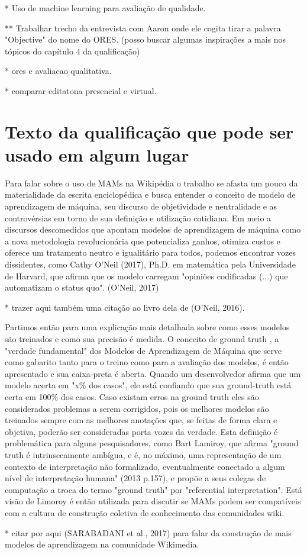 * Uso de machine learning para avaliação de qualidade.

** Trabalhar trecho da entrevista com Aaron onde ele cogita tirar a palavra "Objective" do nome do ORES. (posso buscar algumas inspirações a mais nos tópicos do capítulo 4 da qualificação)

* ores e avaliacao qualitativa.

* comparar editatona presencial e virtual.

\section{Texto da qualificação que pode ser usado em algum lugar}

Para falar sobre o uso de MAMs na Wikipédia o trabalho se afasta um pouco da materialidade da escrita enciclopédica e busca entender o conceito de modelo de aprendizagem de máquina, seu discurso de objetividade e neutralidade e as controvérsias em torno de sua definição e utilização cotidiana. Em meio a discursos descomedidos que apontam modelos de aprendizagem de máquina como a nova metodologia revolucionária que potencializa ganhos, otimiza custos e oferece um tratamento neutro e igualitário para todos, podemos encontrar vozes dissidentes, como Cathy O'Neil (2017), Ph.D. em matemática pela Universidade de Harvard, que afirma que os modelo carregam "opiniões codificadas (...) que automatizam o status quo". (O'Neil, 2017)

* trazer aqui também uma citação ao livro dela de (O'Neil, 2016).

Partimos então para uma explicação mais detalhada sobre como esses modelos são treinados e como sua precisão é medida. O conceito de ground truth , a "verdade fundamental" dos Modelos de Aprendizagem de Máquina que serve como gabarito tanto para o treino como para a avaliação dos modelos, é então apresentado e sua caixa-preta é aberta. Quando um desenvolvedor afirma que um modelo acerta em "x\% dos casos", ele está confiando que sua ground-truth está certa em 100\% dos casos. Caso existam erros na ground truth eles são considerados problemas a serem corrigidos, pois os melhores modelos são treinados sempre com as melhores anotações que, se feitas de forma clara e objetiva, poderão ser consideradas porta vozes da verdade. Esta definição é problemática para alguns pesquisadores, como Bart Lamiroy, que afirma "ground truth é intrinsecamente ambígua, e é, no máximo, uma representação de um contexto de interpretação não formalizado, eventualmente conectado a algum nível de interpretação humana" (2013 p.157), e propõe a seus colegas de computação a troca do termo "ground truth" por "referential interpretation". Está visão de Limoroy é então utilizada para discutir se MAMs podem ser compatíveis com a cultura de construção coletiva de conhecimento das comunidades wiki.

* citar por aqui (SARABADANI et al., 2017) para falar da construção de mais modelos de aprendizagem na comunidade Wikimedia.